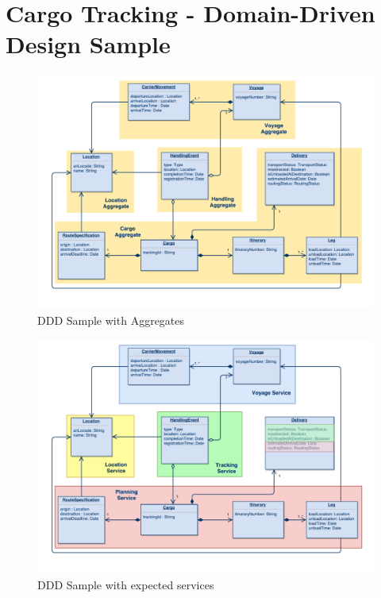 \section{Cargo Tracking - Domain-Driven Design Sample}
\label{sec:dddSample}

\begin{figure}[H]
	\includegraphics[scale=0.5]{diagrams/ddd_sample_aggregates.pdf}
	\caption{DDD Sample with Aggregates}
	\label{fig:dddSampleAggregates}
\end{figure}

\begin{figure}[H]
	\includegraphics[scale=0.5]{diagrams/ddd_sample_services.pdf}
	\caption{DDD Sample with expected services}
	\label{fig:dddSampleServices}
\end{figure}


